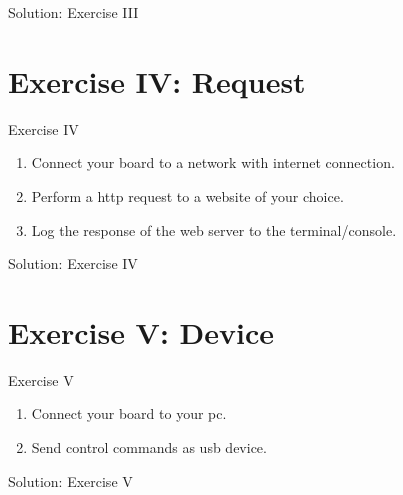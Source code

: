 \documentclass[aspectratio=169]{beamer}
\begin{document}
\begin{frame}{Solution: Exercise III}
    \begin{listing}[H]
        \caption{Solution for Exercise III.}
        \label{lst:arduino:exercise:3:solution}
    \end{listing}
\end{frame}

\section{Exercise IV:  Request}

\begin{frame}
    \begin{exampleblock}{Exercise IV}
        \begin{enumerate}
            \item Connect your board to a network with internet connection.
            \item Perform a \acs{http} request to a website of your choice.
            \item Log the response of the web server to the terminal/console.
        \end{enumerate}
    \end{exampleblock}
\end{frame}

\begin{frame}{Solution: Exercise IV}
\end{frame}

\section{Exercise V:  Device}

\begin{frame}
    \begin{exampleblock}{Exercise V}
        \begin{enumerate}
            \item Connect your board to your \acs{pc}.
            \item Send control commands as \acs{usb} device.
        \end{enumerate}
    \end{exampleblock}
\end{frame}

\begin{frame}{Solution: Exercise V}
\end{frame}
\end{document}
